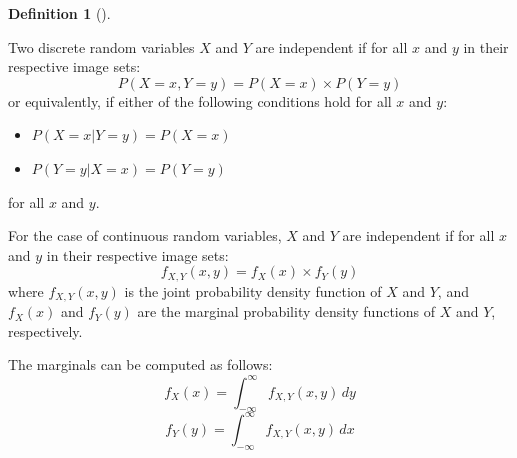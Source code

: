 \documentclass[
  letterpaper,
  DIV=11,
  numbers=noendperiod]{scrreport}
\providecommand{\tightlist}{%
  \setlength{\itemsep}{0pt}\setlength{\parskip}{0pt}}
\theoremstyle{definition}
\theoremstyle{plain}
\theoremstyle{definition}
\newtheorem{definition}{Definition}[chapter]
\theoremstyle{plain}
\theoremstyle{remark}
\begin{document}
\begin{tcolorbox}[enhanced jigsaw, breakable, opacityback=0, leftrule=.75mm, colback=white, bottomtitle=1mm, coltitle=black, toptitle=1mm, titlerule=0mm, bottomrule=.15mm, colframe=quarto-callout-note-color-frame, title={Independent Random Variables}, opacitybacktitle=0.6, colbacktitle=quarto-callout-note-color!10!white, rightrule=.15mm, arc=.35mm, toprule=.15mm, left=2mm]

\begin{definition}[]\protect\hypertarget{def-independent-random-variables}{}\label{def-independent-random-variables}

Two discrete random variables \(X\) and \(Y\) are independent if for all
\(x\) and \(y\) in their respective image sets:
\[ P(X = x, Y = y) = P(X = x) \times P(Y = y) \] or equivalently, if
either of the following conditions hold for all \(x\) and \(y\):

\begin{itemize}
\tightlist
\item
  \(P(X = x | Y = y) = P(X = x)\)
\item
  \(P(Y = y | X = x) = P(Y = y)\)
\end{itemize}

for all \(x\) and \(y\).

For the case of continuous random variables, \(X\) and \(Y\) are
independent if for all \(x\) and \(y\) in their respective image sets:
\[ f_{X,Y}(x, y) = f_X(x) \times f_Y(y) \] where \(f_{X,Y}(x, y)\) is
the joint probability density function of \(X\) and \(Y\), and
\(f_X(x)\) and \(f_Y(y)\) are the marginal probability density functions
of \(X\) and \(Y\), respectively.

The marginals can be computed as follows: \[
f_X(x) = \int_{-\infty}^{\infty} f_{X,Y}(x, y) \, dy
\] \[
f_Y(y) = \int_{-\infty}^{\infty} f_{X,Y}(x, y) \, dx
\]

\end{definition}

\end{tcolorbox}
\end{document}
